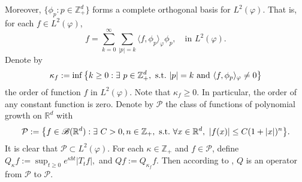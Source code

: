 \documentclass[12pt]{amsart}
\theoremstyle{plain}
\theoremstyle{definition}
\numberwithin{equation}{section}
\begin{document}
    Moreover, $\{\phi_p: p \in \mathbb Z_+^d\}$ forms a complete orthogonal basis for $L^2(\varphi)$.
    That is, for each $f\in L^2(\varphi)$,
\begin{equation}\label{semicomp1}
    f
    =\sum_{k=0}^{\infty}\sum_{|p|=k}\langle f, \phi_p \rangle_{\varphi} \phi_p,
    \quad \text{in~} L^2(\varphi).
\end{equation}
    Denote by
\begin{equation}\label{order}
    \kappa_f
    :=\inf \left \{k\geq 0: \exists ~ p\in \mathbb Z_+^d ,{\rm ~s.t.~}|p|=k {\rm ~and~}  \langle f, \phi_p \rangle_{\varphi}\neq 0\right \}
\end{equation}
    the order of function $f$ in $L^2(\varphi)$.
    Note that $ \kappa_f\geq 0$.
    In particular, the order of any constant function is zero.
    Denote by $\mathcal P$ the class of functions of polynomial growth on $\mathbb R^d$ with
\begin{equation}
    \mathcal{P}
    :=\big \{f\in \mathscr B(\mathbb{R}^d):\exists~ C>0, n \in \mathbb Z_+, {\rm ~s.t.~} \forall x\in \mathbb{R}^d,~ |f(x)|\leq C(1+|x|)^n\big\}.
\end{equation}
    It is clear that $\mathcal{P} \subset L^2(\varphi)$.
    For each $\kappa \in \mathbb Z_+$ and $f\in \mathcal P$, define
$
	Q_\kappa f := \sup_{t\geq 0} e^{\kappa b t}|T_t f|,
$
and
$
	Q f:= Q_{\kappa_f}f.
$
    Then according to \cite[Fact 1.2]{MM}, $Q$ is an operator from $\mathcal P$ to $\mathcal P$.
\begin{comment}

	\deleted{
	For each $\kappa\geq0$, define $\mathcal{P}_{\kappa}$ by
	\begin{align}
	     \mathcal{P}_{\kappa}
    :=\big \{f\in \mathcal{P}:\exists~ C>0, n \in \mathbb Z_+, {\rm ~s.t.~} \forall x\in \mathbb{R}^d,~ \sup_{t\geq0}e^{\kappa b t}|T_tf(x)|\leq C(1+|x|)^n\big\}.
	\end{align}
	and an operator $Q_{\kappa}:\mathcal{P}_{\kappa}\mapsto\mathcal{P}\cap\mathscr{B}(\mathbb{R}^d,\mathbb{R}_+)$ by $Q_{\kappa}f=\sup_{t\geq0}e^{\kappa b t}|T_tf|$.
	Then
	\begin{itemize}
	    \item For each $\kappa_1\geq \kappa_2$, $\mathcal{P}_{\kappa_1}\subset\mathcal{P}_{\kappa_2}$, and $\mathcal{P}=\cup_{\kappa\geq 0}\mathcal{P}_{\kappa}$.
	    \item for each $f\in \mathcal{P}$, then $f\in \mathcal{P}_{\kappa_f}$, and $Q_{\kappa}f\leq Qf:=Q_{\kappa_f}f$, $\kappa\leq \kappa_f$.

	\end{itemize}
	}
\end{comment}
\end{document}
